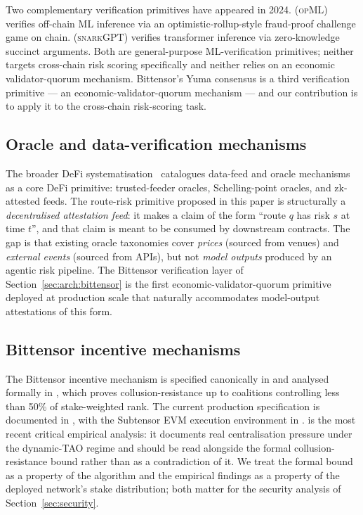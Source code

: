 \documentclass[11pt,a4paper]{article}
\begin{document}
Two complementary verification primitives have appeared in 2024.
\cite{conway2024opml} (\textsc{opML}) verifies off-chain ML inference via an
optimistic-rollup-style fraud-proof challenge game on chain. \cite{ganescu2024trust}
(\textsc{snarkGPT}) verifies transformer inference via zero-knowledge succinct
arguments. Both are general-purpose ML-verification primitives; neither targets
cross-chain risk scoring specifically and neither relies on an economic
validator-quorum mechanism. Bittensor's Yuma consensus is a third verification
primitive --- an economic-validator-quorum mechanism --- and our contribution is to apply
it to the cross-chain risk-scoring task.

\subsection{Oracle and data-verification mechanisms}\label{sec:related:oracle}

The broader DeFi systematisation~\cite{werner2022sok} catalogues data-feed and oracle
mechanisms as a core DeFi primitive: trusted-feeder oracles, Schelling-point oracles, and
zk-attested feeds. The route-risk primitive proposed in this paper is structurally a
\emph{decentralised attestation feed}: it makes a claim of the form ``route $q$ has risk
$s$ at time $t$'', and that claim is meant to be consumed by downstream contracts. The
gap is that existing oracle taxonomies cover \emph{prices} (sourced from venues) and
\emph{external events} (sourced from APIs), but not \emph{model outputs} produced by an
agentic risk pipeline. The Bittensor verification layer of Section~\ref{sec:arch:bittensor}
is the first economic-validator-quorum primitive deployed at production scale that
naturally accommodates model-output attestations of this form.

\subsection{Bittensor incentive mechanisms}\label{sec:related:bittensor}

The Bittensor incentive mechanism is specified canonically in
\cite{rao2021bittensor} and analysed formally in \cite{steeves2022incentivizing}, which
proves collusion-resistance up to coalitions controlling less than 50\% of stake-weighted
rank. The current production specification is documented in
\cite{opentensor2024yuma}, with the Subtensor EVM execution environment in
\cite{opentensor2024evm}. \cite{lui2025bittensor} is the most recent critical empirical
analysis: it documents real centralisation pressure under the dynamic-TAO regime and
should be read alongside the formal collusion-resistance bound rather than as a
contradiction of it. We treat the formal bound as a property of the algorithm and the
empirical findings as a property of the deployed network's stake distribution; both
matter for the security analysis of Section~\ref{sec:security}.
\end{document}
